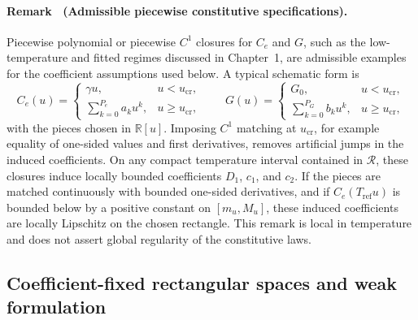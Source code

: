 \paragraph{Remark \thetheorem\ (Admissible piecewise constitutive specifications).}\label{rem:app-ch2-piecewise-closures}
Piecewise polynomial or piecewise \(C^1\) closures for \(C_e\) and \(G\), such as the low-temperature and fitted regimes discussed in Chapter~1, are admissible examples for the coefficient assumptions used below. A typical schematic form is
\[
    C_e(u)
    =
    \begin{cases}
        \gamma u,                             & u<u_{\mathrm{cr}},    \\
        \displaystyle\sum_{k=0}^{P_e}a_k u^k, & u\ge u_{\mathrm{cr}},
    \end{cases}
    \qquad
    G(u)
    =
    \begin{cases}
        G_0,                                  & u<u_{\mathrm{cr}},    \\
        \displaystyle\sum_{k=0}^{P_G}b_k u^k, & u\ge u_{\mathrm{cr}},
    \end{cases}
\]
with the pieces chosen in \(\mathbb{R}[u]\). Imposing \(C^1\) matching at \(u_{\mathrm{cr}}\), for example equality of one-sided values and first derivatives, removes artificial jumps in the induced coefficients. On any compact temperature interval contained in \(\mathcal{R}\), these closures induce locally bounded coefficients \(D_1\), \(c_1\), and \(c_2\). If the pieces are matched continuously with bounded one-sided derivatives, and if \(C_e(T_{\mathrm{ref}}u)\) is bounded below by a positive constant on \([m_u,M_u]\), these induced coefficients are locally Lipschitz on the chosen rectangle. This remark is local in temperature and does not assert global regularity of the constitutive laws.

\subsection{Coefficient-fixed rectangular spaces and weak formulation}
\label{sec:app-ch2-frozen-weak-form}

